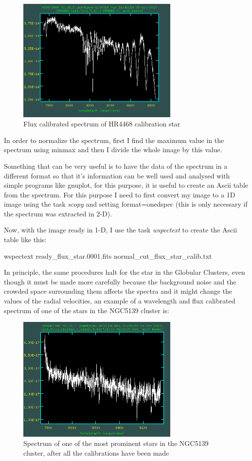 \begin{figure}[H]
\centering
\includegraphics[width=8cm]{images/calib_star_flux.png}
\caption[Flux calibrated spectrum of HR4468]{Flux calibrated spectrum of HR4468 calibration star}
\end{figure}

In order to normalize the spectrum, first I find the maximum value in the spectrum using minmax and then I divide the whole image by this value. 

Something that can be very useful is to have the data of the spectrum in a different format so that it's information can be well used and analysed with simple programs like gnuplot, for this purpose, it is useful to create an Ascii table from the spectrum. For this purpose I need to first convert my image to a 1D image using the task \textit{scopy} and setting format=onedspec (this is only necessary if the spectrum was extracted in 2-D).

Now, with the image ready in 1-D, I use the task \textit{wspectext} to create the Ascii table like this:

\begin{center}
wspectext ready\_flux\_star.0001.fits normal\_cut\_flux\_star\_calib.txt
\end{center}

In principle, the same procedures halt for the star in the Globular Clusters, even though it must be made more carefully because the background noise and the crowded space surrounding them affects the spectra and it might change the values of the radial velocities, an example of a wavelength and flux calibrated spectrum of one of the stars in the NGC5139 cluster is:

\begin{figure}[H]
\centering
\includegraphics[width=8cm]{images/cluster_star_flux.png}
\caption[Spectrum of a prominent star of the NGC5139 globular cluster]{Spectrum of one of the most prominent stars in the NGC5139 cluster, after all the calibrations have been made}
\end{figure}


